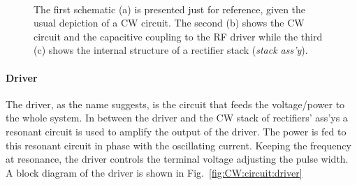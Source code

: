 \begin{refsection}
        \begin{figure}[ht]   
            \centering
            \label{fig:CW:circuit:standard}
            \\
            \caption{The first schematic (a) is presented just for reference, given the usual depiction of a CW circuit. The second (b) shows the CW circuit and the capacitive coupling to the RF driver while the third (c) shows the internal structure of a rectifier stack (\textit{stack ass'y}).}
        \end{figure}

        \paragraph{Driver}
        The driver, as the name suggests, is the circuit that feeds the voltage/power to the whole system.
        In between the driver and the CW stack of rectifiers' ass'ys a resonant circuit is used to amplify the output of the driver.
        The power is fed to this resonant circuit in phase with the oscillating current.
        Keeping the frequency at resonance, the driver controls the terminal voltage adjusting the pulse width.
        A block diagram of the driver is shown in Fig.~\ref{fig:CW:circuit:driver}


\end{refsection}
